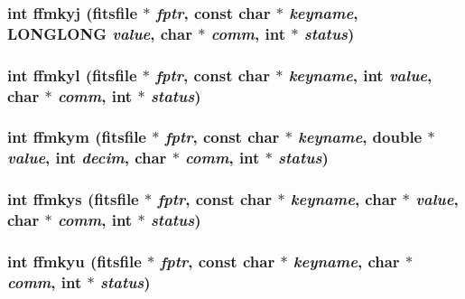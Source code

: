 \subsubsection{\setlength{\rightskip}{0pt plus 5cm}int ffmkyj (\bf{fitsfile} $\ast$ {\em fptr}, const char $\ast$ {\em keyname}, \bf{LONGLONG} {\em value}, char $\ast$ {\em comm}, int $\ast$ {\em status})}\label{src_2fitsio_8h_9337d5f08bcd5c82afc87256596ded23}


\subsubsection{\setlength{\rightskip}{0pt plus 5cm}int ffmkyl (\bf{fitsfile} $\ast$ {\em fptr}, const char $\ast$ {\em keyname}, int {\em value}, char $\ast$ {\em comm}, int $\ast$ {\em status})}\label{src_2fitsio_8h_b0edcf1260c7df986e19da627da36ee1}


\subsubsection{\setlength{\rightskip}{0pt plus 5cm}int ffmkym (\bf{fitsfile} $\ast$ {\em fptr}, const char $\ast$ {\em keyname}, double $\ast$ {\em value}, int {\em decim}, char $\ast$ {\em comm}, int $\ast$ {\em status})}\label{src_2fitsio_8h_2e1ce1cd4c5dec3d5966edd8febeb9c0}


\subsubsection{\setlength{\rightskip}{0pt plus 5cm}int ffmkys (\bf{fitsfile} $\ast$ {\em fptr}, const char $\ast$ {\em keyname}, char $\ast$ {\em value}, char $\ast$ {\em comm}, int $\ast$ {\em status})}\label{src_2fitsio_8h_4de4d8a5bcc63ae6b2aa1162d5173147}


\subsubsection{\setlength{\rightskip}{0pt plus 5cm}int ffmkyu (\bf{fitsfile} $\ast$ {\em fptr}, const char $\ast$ {\em keyname}, char $\ast$ {\em comm}, int $\ast$ {\em status})}\label{src_2fitsio_8h_a130f6faad71e05cd648b6f0443a6fc1}


